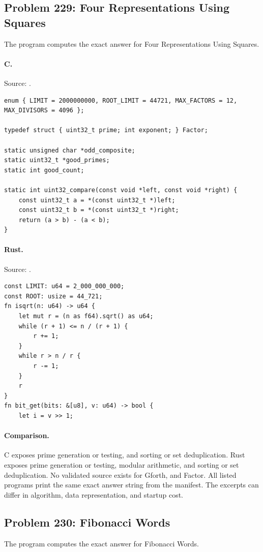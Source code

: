 \subsection{Problem 229: Four Representations Using Squares}
\label{walkthrough:p229}
The program computes the exact answer for Four Representations Using Squares.

\paragraph{C.} Source: .
\begin{lstlisting}
enum { LIMIT = 2000000000, ROOT_LIMIT = 44721, MAX_FACTORS = 12, MAX_DIVISORS = 4096 };

typedef struct { uint32_t prime; int exponent; } Factor;

static unsigned char *odd_composite;
static uint32_t *good_primes;
static int good_count;

static int uint32_compare(const void *left, const void *right) {
    const uint32_t a = *(const uint32_t *)left;
    const uint32_t b = *(const uint32_t *)right;
    return (a > b) - (a < b);
}
\end{lstlisting}

\paragraph{Rust.} Source: .
\begin{lstlisting}
const LIMIT: u64 = 2_000_000_000;
const ROOT: usize = 44_721;
fn isqrt(n: u64) -> u64 {
    let mut r = (n as f64).sqrt() as u64;
    while (r + 1) <= n / (r + 1) {
        r += 1;
    }
    while r > n / r {
        r -= 1;
    }
    r
}
fn bit_get(bits: &[u8], v: u64) -> bool {
    let i = v >> 1;
\end{lstlisting}

\paragraph{Comparison.}
C exposes prime generation or testing, and sorting or set deduplication. Rust exposes prime generation or testing, modular arithmetic, and sorting or set deduplication.
No validated source exists for Gforth, and Factor.
All listed programs print the same exact answer string from the manifest. The excerpts can differ in algorithm, data representation, and startup cost.

\subsection{Problem 230: Fibonacci Words}
\label{walkthrough:p230}
The program computes the exact answer for Fibonacci Words.

